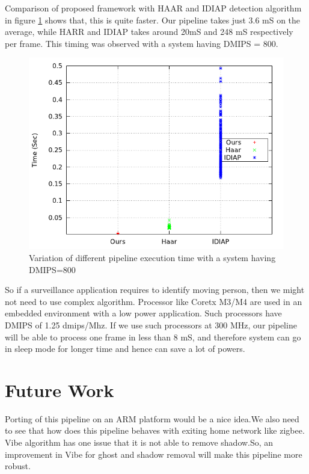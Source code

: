 \documentclass[conference]{IEEEtran}
\begin{document}
Comparison of proposed framework with HAAR and IDIAP detection algorithm
in figure \ref{pipeline_execution_time} shows that, this is quite
faster. Our pipeline takes just 3.6 mS on the average, while HARR and
IDIAP takes around 20mS and 248 mS respectively per frame. This timing
was observed with a system having DMIPS = 800.

\begin{figure}[!h]
\centering
\includegraphics[scale=0.30]{figures/pipeline_execution_time}
\caption{Variation of different pipeline execution time with a system
having DMIPS=800}
\label{pipeline_execution_time}
\end{figure}

So if a surveillance application requires to identify moving person,
then we might not need to use complex algorithm. Processor like Coretx
M3/M4 are used in an embedded environment with a low power application.
Such processors have DMIPS of 1.25 dmips/Mhz. If we use such processors
at 300 MHz, our pipeline will be able to process one frame in less than
8 mS, and therefore system can go in sleep mode for longer time and
hence can save a lot of powers.

\section{Future Work}

Porting of this pipeline on an ARM platform would be a nice idea.We also
need to see that how does this pipeline behaves with exiting home
network like zigbee. Vibe algorithm has one issue that it is not able to
remove shadow.So, an improvement in Vibe for ghost and shadow removal
will make this pipeline more robust.
\end{document}

